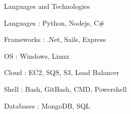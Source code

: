 

\begin{cventries}

  \cventry
    {Languages and Technologies}
    {}
    {}
    {}
    {
      \begin{cvitems} %
        \item {Languages : Python, Nodejs, C#}
	\item {Frameworks : .Net, Sails, Express}	
	\item {OS : Windows, Linux}	
	\item {Cloud : EC2, SQS, S3, Load Balancer}	
	\item {Shell : Bash, GitBash, CMD, Powershell}	
	\item {Databases : MongoDB, SQL}	
      \end{cvitems}
    }

\end{cventries}
